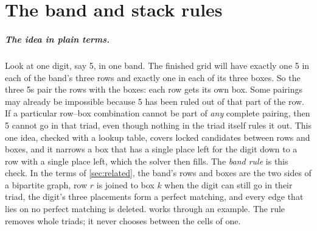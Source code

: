 \documentclass[a4paper,USenglish,cleveref,anonymous]{lipics-v2021}
\begin{document}
\section{The band and stack rules}
\label{sec:rules}

\subparagraph{The idea in plain terms.} Look at one digit, say 5, in one band. The finished grid will have exactly one 5
in each of the band's three rows and exactly one in each of its three boxes. So the three 5s pair the rows with the
boxes: each row gets its own box. Some pairings may already be impossible because 5 has been ruled out of that part of
the row. If a particular row--box combination cannot be part of \emph{any} complete pairing, then 5 cannot go in that
triad, even though nothing in the triad itself rules it out. This one idea, checked with a lookup table,
covers locked candidates between rows and boxes, and it narrows a box that has a single place left for the digit down
to a row with a single place left, which the solver then fills. The \emph{band rule} is this check. In the terms of
\cref{sec:related}, the band's rows and boxes are the two sides of a bipartite graph, row $r$ is joined to box $k$ when
the digit can still go in their triad, the digit's three placements form a perfect matching, and every edge that lies
on no perfect matching is deleted.  works through an example. The rule removes whole triads; it never
chooses between the cells of one.
\end{document}
